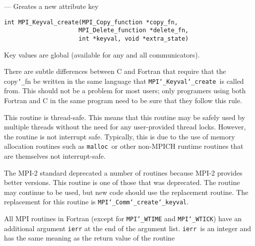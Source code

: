 \startmanpage
{}
--- Greates a new attribute key 
\startvb\begin{verbatim}
int MPI_Keyval_create(MPI_Copy_function *copy_fn, 
                     MPI_Delete_function *delete_fn, 
                     int *keyval, void *extra_state)

\end{verbatim}
\endvb

\par
{}
\par
{}
Key values are global (available for any and all communicators).
\par
There are subtle differences between C and Fortran that require that the
copy{\tt \char`\_}fn be written in the same language that {\tt MPI{\tt \char`\_}Keyval{\tt \char`\_}create
}is called from.
This should not be a problem for most users; only programers using both
Fortran and C in the same program need to be sure that they follow this rule.
\par
{}
\par
This routine is thread-safe.  This means that this routine may be
safely used by multiple threads without the need for any user-provided
thread locks.  However, the routine is not interrupt safe.  Typically,
this is due to the use of memory allocation routines such as {\tt malloc
}or other non-MPICH runtime routines that are themselves not interrupt-safe.
\par
{}
The MPI-2 standard deprecated a number of routines because MPI-2 provides
better versions.  This routine is one of those that was deprecated.  The
routine may continue to be used, but new code should use the replacement
routine.
The replacement for this routine is {\tt MPI{\tt \char`\_}Comm{\tt \char`\_}create{\tt \char`\_}keyval}.
\par
{}
All MPI routines in Fortran (except for {\tt MPI{\tt \char`\_}WTIME} and {\tt MPI{\tt \char`\_}WTICK}) have
an additional argument {\tt ierr} at the end of the argument list.  {\tt ierr
}is an integer and has the same meaning as the return value of the routine
